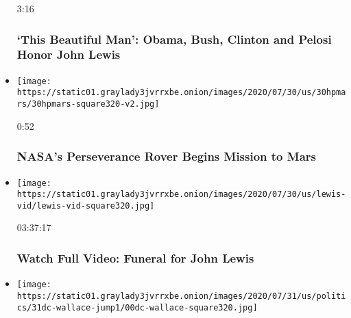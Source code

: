 \begin{itemize}
  3:16

  \hypertarget{this-beautiful-man-obama-bush-clinton-and-pelosi-honor-john-lewis}{%
  \subsubsection{`This Beautiful Man': Obama, Bush, Clinton and Pelosi
  Honor John
  Lewis}\label{this-beautiful-man-obama-bush-clinton-and-pelosi-honor-john-lewis}}
\item
  \href{https://www.nytimes3xbfgragh.onion/video/us/100000007264604/nasas-perseverance-mars.html?action=click\&module=video-series-bar\&region=header\&pgtype=Article\&playlistId=video/latest-video}{}

  \texttt{[image: https://static01.graylady3jvrrxbe.onion/images/2020/07/30/us/30hpmars/30hpmars-square320-v2.jpg]}

  0:52

  \hypertarget{nasas-perseverance-rover-begins-mission-to-mars}{%
  \subsubsection{NASA's Perseverance Rover Begins Mission to
  Mars}\label{nasas-perseverance-rover-begins-mission-to-mars}}
\item
  \href{https://www.nytimes3xbfgragh.onion/video/us/politics/100000007264379/john-lewis-funeral.html?action=click\&module=video-series-bar\&region=header\&pgtype=Article\&playlistId=video/latest-video}{}

  \texttt{[image: https://static01.graylady3jvrrxbe.onion/images/2020/07/30/us/lewis-vid/lewis-vid-square320.jpg]}

  03:37:17

  \hypertarget{watch-full-video-funeral-for-john-lewis}{%
  \subsubsection{Watch Full Video: Funeral for John
  Lewis}\label{watch-full-video-funeral-for-john-lewis}}
\item
  \href{https://www.nytimes3xbfgragh.onion/video/us/politics/100000007255898/trump-george-wallace-rhetoric.html?action=click\&module=video-series-bar\&region=header\&pgtype=Article\&playlistId=video/latest-video}{}

  \texttt{[image: https://static01.graylady3jvrrxbe.onion/images/2020/07/31/us/politics/31dc-wallace-jump1/00dc-wallace-square320.jpg]}


\end{itemize}
